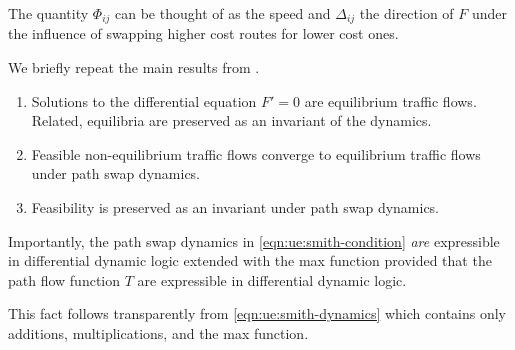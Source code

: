 The quantity $\Phi_{ij}$ can be thought of as the speed and $\Delta_{ij}$ the direction of $F$ under the influence of swapping higher cost routes for lower cost ones.

We briefly repeat the main results from \citet{smith1984stability}.

\begin{enumerate}
    \item Solutions to the differential equation $F'=0$ are equilibrium traffic flows. Related, equilibria are preserved as an invariant of the dynamics.
    \item Feasible non-equilibrium traffic flows converge to equilibrium traffic flows under path swap dynamics.
    \item Feasibility is preserved as an invariant under path swap dynamics.
\end{enumerate}

\begin{remark}
Importantly, the path swap dynamics in \eqref{eqn:ue:smith-condition} \textit{are} expressible in differential dynamic logic extended with the max function provided that the path flow function $T$ are expressible in differential dynamic logic.
\end{remark}

This fact follows transparently from \eqref{eqn:ue:smith-dynamics} which contains only additions, multiplications, and the max function. 

